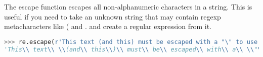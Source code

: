 The escape function escapes all non-alphanumeric characters in a string. This is
useful if you need to take an unknown string that may contain regexp
metacharacters like ( and . and create a regular expression from it.
\lstset{basicstyle=\scriptsize, numbers=left, captionpos=b, tabsize=4}
\begin{lstlisting}[caption=Escape,language={Python},
xleftmargin=15pt, label=lst:escape]
>>> re.escape(r'This text (and this) must be escaped with a "\" to use in a regexp.')
'This\\ text\\ \\(and\\ this\\)\\ must\\ be\\ escaped\\ with\\ a\\ \\"\\\\\\"\\ to\\ use\\ in\\ a\\ regexp\\.'
\end{lstlisting}
